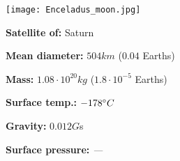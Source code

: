 \begin{tcolorbox}[colback=red!5,colframe=DarkRed!40!black,title=Enceladus \cite{Enceladus}]

{\centering
\texttt{[image: Enceladus\_moon.jpg]}
\par}

\textbf{Satellite of:} Saturn

\textbf{Mean diameter:} $504km$ ($0.04$ Earths)

\textbf{Mass:} $1.08\cdot 10^{20}kg$ ($1.8\cdot 10^{-5}$ Earths)

\textbf{Surface temp.:} $-178\degree C$

\textbf{Gravity:} $0.012 G$s

\textbf{Surface pressure:} \textit{---}
\end{tcolorbox}

